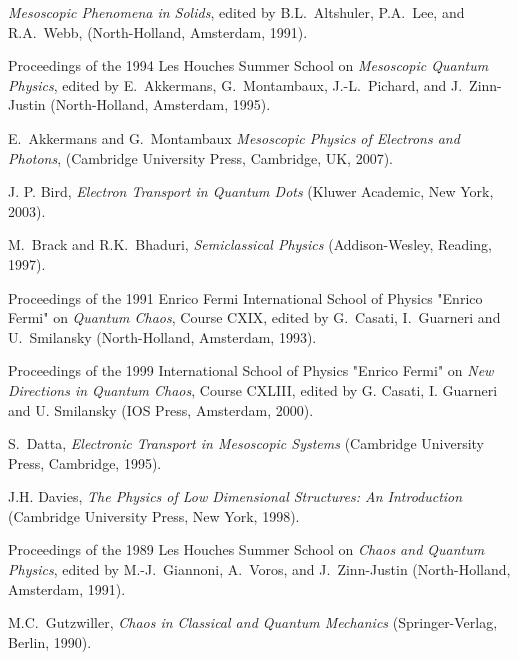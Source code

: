 \documentclass[a4paper,10pt]{article}
\begin{document}
\renewcommand{\refname}{Recommended reading (mainly books and special issues)}
\begin{thebibliography}{Cucc~02b}


{\it Mesoscopic Phenomena in Solids}, edited by 
B.L.~Altshuler, P.A.~Lee, and R.A.~Webb, (North-Holland,
Amsterdam, 1991).

Proceedings of the 1994 Les Houches Summer School
on {\it Mesoscopic Quantum Physics}, edited by E.~Akkermans, 
G.~Montambaux, J.-L.~Pichard, and J.~Zinn-Justin (North-Holland, 
Amsterdam, 1995).

E.~Akkermans and G.~Montambaux 
{\it Mesoscopic Physics of Electrons and Photons},
(Cambridge University Press, Cambridge, UK, 2007).

J. P. Bird, 
{\it Electron Transport in Quantum Dots}
(Kluwer Academic, New York, 2003).

M.~Brack and R.K.~Bhaduri, {\it Semiclassical Physics}
(Addison-Wesley, Reading, 1997).

Proceedings of the 1991 Enrico Fermi International
School of Physics "Enrico Fermi" on {\em Quantum Chaos}, Course CXIX, edited by G.~Casati, I.~Guarneri
and U.~Smilansky (North-Holland, Amsterdam, 1993).

 Proceedings of the 1999 International School of Physics "Enrico Fermi" on
{\it New Directions in Quantum Chaos}, Course CXLIII, edited by G. Casati, 
I. Guarneri and U. Smilansky (IOS Press, Amsterdam, 2000).

S.~Datta, {\it Electronic Transport in Mesoscopic Systems}
(Cambridge University Press, Cambridge, 1995).

J.H. Davies, 
{\it The Physics of Low Dimensional Structures: An Introduction} 
(Cambridge University Press, New York, 1998). 

 Proceedings of the 1989 Les Houches Summer School 
on {\em Chaos and Quantum Physics}, edited  by M.-J.~Giannoni, A.~Voros, 
and J.~Zinn-Justin (North-Holland, Amsterdam, 1991).

M.C.~Gutzwiller, {\it Chaos in Classical and Quantum Mechanics} (Springer-Verlag, Berlin, 1990).


\end{thebibliography}
\end{document}
